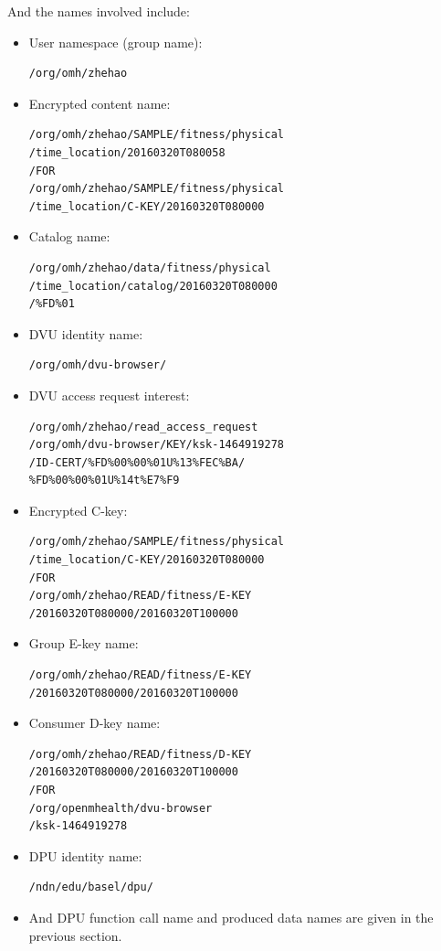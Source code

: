 \documentclass[letterpaper,twocolumn,11pt]{article}
\begin{document}
And the names involved include: 
\begin{itemize}
\item User namespace (group name): 
\begin{verbatim}
/org/omh/zhehao
\end{verbatim} 

\item Encrypted content name:
\begin{verbatim}
/org/omh/zhehao/SAMPLE/fitness/physical
/time_location/20160320T080058
/FOR
/org/omh/zhehao/SAMPLE/fitness/physical
/time_location/C-KEY/20160320T080000
\end{verbatim} 

\item Catalog name:
\begin{verbatim}
/org/omh/zhehao/data/fitness/physical
/time_location/catalog/20160320T080000
/%FD%01
\end{verbatim} 

\item DVU identity name: 
\begin{verbatim}
/org/omh/dvu-browser/
\end{verbatim} 

\item DVU access request interest:
\begin{verbatim}
/org/omh/zhehao/read_access_request
/org/omh/dvu-browser/KEY/ksk-1464919278
/ID-CERT/%FD%00%00%01U%13%FEC%BA/
%FD%00%00%01U%14t%E7%F9
\end{verbatim} 

\item Encrypted C-key:
\begin{verbatim}
/org/omh/zhehao/SAMPLE/fitness/physical
/time_location/C-KEY/20160320T080000
/FOR
/org/omh/zhehao/READ/fitness/E-KEY
/20160320T080000/20160320T100000
\end{verbatim} 

\item Group E-key name:
\begin{verbatim}
/org/omh/zhehao/READ/fitness/E-KEY
/20160320T080000/20160320T100000
\end{verbatim} 

\item Consumer D-key name:
\begin{verbatim}
/org/omh/zhehao/READ/fitness/D-KEY
/20160320T080000/20160320T100000
/FOR
/org/openmhealth/dvu-browser
/ksk-1464919278
\end{verbatim} 

\item DPU identity name: 
\begin{verbatim}
/ndn/edu/basel/dpu/
\end{verbatim} 

\item And DPU function call name and produced data names are given in the previous section.

\end{itemize}
\end{document}
